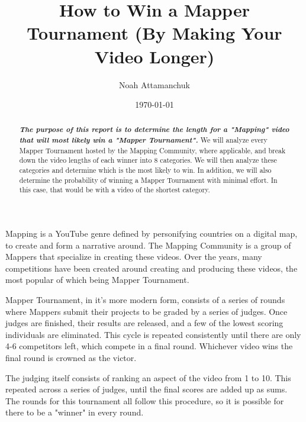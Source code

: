 \documentclass[letterpaper,twocolumn,amsmath,amssymb,prl,nolongbibliography,url,reprint]{revtex4-2}
\begin{document}
\preprint{}

\title{How to Win a Mapper Tournament (By Making Your Video Longer)}


\author{Noah Attamanchuk}
%

\date{\today}%

\begin{abstract}
\textbf{\emph{The purpose of this report is to determine the length for a "Mapping" video that will most likely win a "Mapper Tournament".}}
We will analyze every Mapper Tournament hosted by the Mapping Community, where applicable, and break down the video lengths of each winner into 8 categories. We will then analyze these categories and determine which is the most likely to win. In addition, we will also determine the probability of winning a Mapper Tournament with minimal effort. In this case, that would be with a video of the shortest category.
\end{abstract}

\maketitle


Mapping is a YouTube genre defined by personifying countries on a digital map, to create and form a narrative around. The Mapping Community is a group of Mappers that specialize in creating these videos. Over the years, many competitions have been created around creating and producing these videos, the most popular of which being Mapper Tournament. 

Mapper Tournament, in it's more modern form, consists of a series of rounds where Mappers submit their projects to be graded by a series of judges. Once judges are finished, their results are released, and a few of the lowest scoring individuals are eliminated. This cycle is repeated consistently until there are only 4-6 competitors left, which compete in a final round. Whichever video wins the final round is crowned as the victor. 

The judging itself consists of ranking an aspect of the video from 1 to 10. This repeated across a series of judges, until the final scores are added up as sums. The rounds for this tournament all follow this procedure, so it is possible for there to be a "winner" in every round. 
\end{document}
